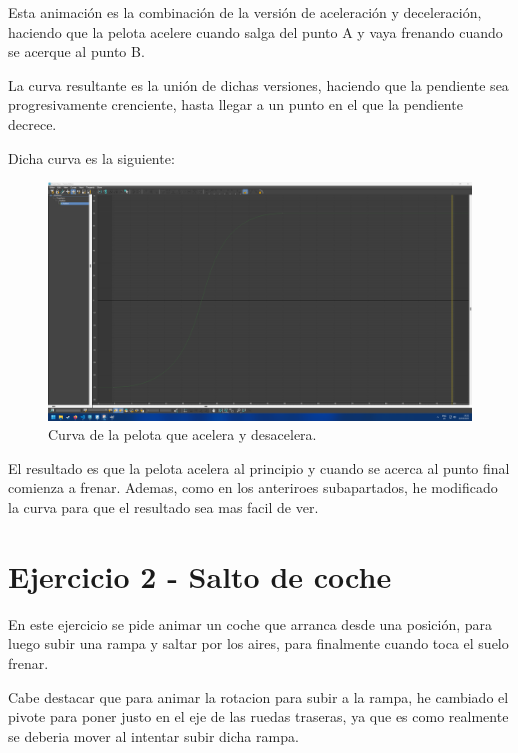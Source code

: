 \documentclass{article}
\begin{document}
Esta animación es la combinación de la versión de aceleración y deceleración, haciendo que la pelota acelere cuando salga del punto A y vaya frenando cuando se acerque al punto B. 

La curva resultante es la unión de dichas versiones, haciendo que la pendiente sea progresivamente crenciente, hasta llegar a un punto en el que la pendiente decrece. 

Dicha curva es la siguiente:

\begin{figure}[H]
    \centering
    \includegraphics[width=\textwidth]{imagenes/Ejercicio 1/curvas/aceldecel.png}
    \caption{Curva de la pelota que acelera y desacelera.}
 \end{figure}

El resultado es que la pelota acelera al principio y cuando se acerca al punto final comienza a frenar. Ademas, como en los anteriroes subapartados, he modificado la curva para que el resultado sea mas facil de ver.


\section{Ejercicio 2 - Salto de coche}

En este ejercicio se pide animar un coche que arranca desde una posición, para luego subir una rampa y saltar por los aires, para finalmente cuando toca el suelo frenar.


Cabe destacar que para animar la rotacion para subir a la rampa, he cambiado el pivote para poner justo en el eje de las ruedas traseras, ya que es como realmente se deberia mover al intentar subir dicha rampa. 
\end{document}

